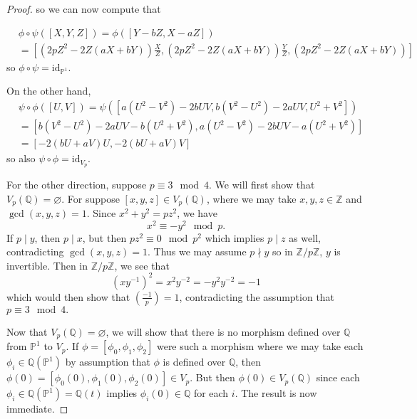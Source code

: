\documentclass{article}
\theoremstyle{customplain}
\theoremstyle{customdef}
\newcommand{\leg}[2]{\genfrac{(}{)}{}{}{#1}{#2}} %
\newcommand{\Z}{\mathbb{Z}}
\newcommand{\Q}{\mathbb{Q}}
\newcommand{\id}{\mathrm{id}}
\renewcommand{\P}{\mathbb{P}}
\let\emptyset\varnothing
\theoremstyle{definition} %
\begin{document}
\begin{proof}
    so we can now compute that
   

    
    \begin{align*}
        &\phi \circ \psi ([X,Y,Z]) = \phi([Y-bZ, X-aZ])\\
        &=[(2pZ^2-2Z(aX+bY)) \frac{X}{Z}, (2pZ^2-2Z(aX+bY)) \frac{Y}{Z}, (2pZ^2-2Z(aX+bY))]
    \end{align*}
    so $\phi \circ \psi = \id_{\P^1}.$

    On the other hand,
    \begin{align*}
        &\psi \circ \phi([U,V]) = \psi([a(U^2-V^2)-2bUV, b(V^2-U^2)-2aUV, U^2+V^2])\\
        & =[b(V^2-U^2)-2aUV-b(U^2+V^2), a(U^2-V^2)-2bUV-a(U^2+V^2)]\\
        &=[-2(bU+aV)U,-2(bU+aV)V]
    \end{align*}
    so also $\psi \circ \phi=\id_{V_p}.$
    

    

    For the other direction, suppose $p\equiv 3 \mod 4.$ We will first show that $V_p(\Q) = \emptyset.$ For suppose $[x,y,z]\in V_p(\Q)$, where we may take $x,y,z\in \Z$ and $\gcd(x,y,z)=1.$ Since $x^2+y^2 = pz^2$, we have
    \[
    x^2 \equiv -y^2 \mod p.
    \]
    If $p\mid y$, then $p\mid x$, but then $pz^2 \equiv 0 \mod p^2$ which implies $p\mid z$ as well, contradicting $\gcd(x,y,z)=1.$ Thus we may assume $p\nmid y$ so in $\Z/p\Z$, $y$ is invertible. Then in $\Z/p\Z$, we see that
    \[
    (xy^{-1})^2 = x^2 y^{-2} = -y^2 y^{-2} = -1
    \]
    which would then show that $\leg{-1}{p}=1$, contradicting the assumption that $p\equiv 3 \mod 4.$

    Now that $V_p(\Q)=\emptyset$, we will show that there is no morphism defined over $\Q$ from $\P^1$ to $V_p.$ If $\phi=[\phi_0, \phi_1, \phi_2]$ were such a morphism where we may take each $\phi_i \in \Q(\P^1)$ by assumption that $\phi$ is defined over $\Q$, then $\phi(0)=[\phi_0(0), \phi_1(0), \phi_2(0)]\in V_p$. But then $\phi(0)\in V_p(\Q)$ since each $\phi_i\in \Q(\P^1)=\Q(t)$ implies $\phi_i(0)\in \Q$ for each $i$. The result is now immediate.
\end{proof}
\end{document}
